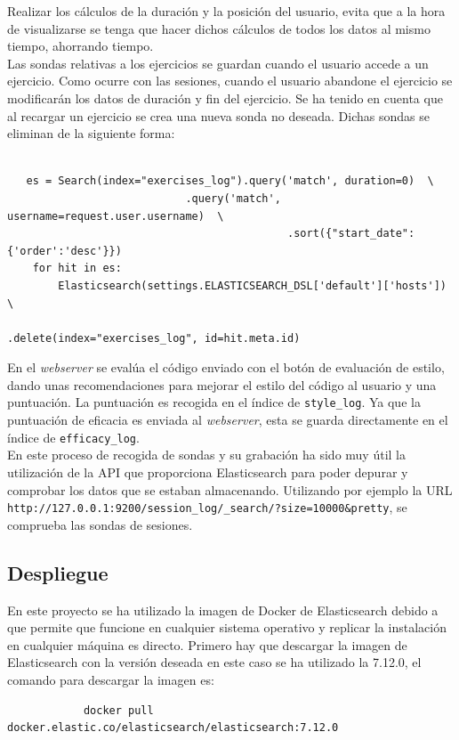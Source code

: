 Realizar los cálculos de la duración y la posición del usuario, evita que a la hora de visualizarse se tenga que hacer dichos cálculos de todos los datos al mismo tiempo, ahorrando tiempo.\\

Las sondas relativas a los ejercicios se guardan cuando el usuario accede a un ejercicio. Como ocurre con las sesiones, cuando el usuario abandone el ejercicio se modificarán los datos de duración y fin del ejercicio. Se ha tenido en cuenta que al recargar un ejercicio se crea una nueva sonda no deseada. Dichas sondas se eliminan de la siguiente forma:\\
\\
{\footnotesize
\begin{verbatim}
   es = Search(index="exercises_log").query('match', duration=0)  \
   				            .query('match', username=request.user.username)  \
        					                .sort({"start_date": {'order':'desc'}})
    for hit in es:
        Elasticsearch(settings.ELASTICSEARCH_DSL['default']['hosts'])  \ 
    				                        .delete(index="exercises_log", id=hit.meta.id)
\end{verbatim}
}

En el \textit{webserver} se evalúa el código enviado con el botón de evaluación de estilo, dando unas recomendaciones para mejorar el estilo del código al usuario y una puntuación. La puntuación es recogida en el índice de \texttt{style\_log}. Ya que la puntuación de eficacia es enviada al \textit{webserver}, esta se guarda directamente en el índice de \texttt{efficacy\_log}. \\

En este proceso de recogida de sondas y su grabación ha sido muy útil la utilización de la API que proporciona Elasticsearch para poder depurar y comprobar los datos que se estaban almacenando. Utilizando por ejemplo la URL    \newline       \texttt{http://127.0.0.1:9200/session\_log/\_search/?size=10000&pretty}, se comprueba las sondas de sesiones.\\
\subsection{Despliegue}
En este proyecto se ha utilizado la imagen de Docker de Elasticsearch debido a que permite que funcione en cualquier sistema operativo y replicar la instalación en cualquier máquina es directo. Primero hay que descargar la imagen de Elasticsearch con la versión deseada en este caso se ha utilizado la 7.12.0, el comando para descargar la imagen es:
{\footnotesize
		\begin{verbatim}
			docker pull docker.elastic.co/elasticsearch/elasticsearch:7.12.0
		\end{verbatim}
		}
        
